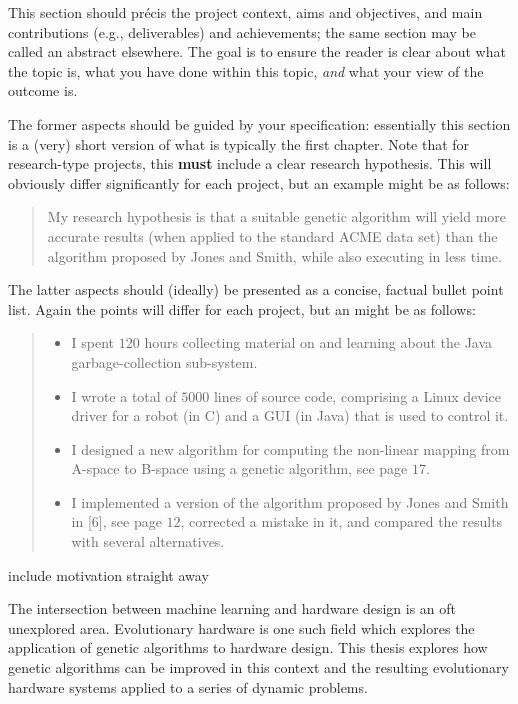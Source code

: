 \noindent
{
	\color{red}
This section should pr\'{e}cis the project context, aims and objectives,
and main contributions (e.g., deliverables) and achievements; the same 
section may be called an abstract elsewhere.  The goal is to ensure the 
reader is clear about what the topic is, what you have done within this 
topic, {\em and} what your view of the outcome is.

The former aspects should be guided by your specification: essentially 
this section is a (very) short version of what is typically the first 
chapter.  Note that for research-type projects, this {\bf must} include 
a clear research hypothesis.  This will obviously differ significantly
for each project, but an example might be as follows:

\begin{quote}
My research hypothesis is that a suitable genetic algorithm will yield
more accurate results (when applied to the standard ACME data set) than 
the algorithm proposed by Jones and Smith, while also executing in less
time.
\end{quote}

\noindent
The latter aspects should (ideally) be presented as a concise, factual 
bullet point list.  Again the points will differ for each project, but 
an might be as follows:

\begin{quote}
\noindent
\begin{itemize}
\item I spent $120$ hours collecting material on and learning about the 
      Java garbage-collection sub-system. 
\item I wrote a total of $5000$ lines of source code, comprising a Linux 
      device driver for a robot (in C) and a GUI (in Java) that is 
      used to control it.
\item I designed a new algorithm for computing the non-linear mapping 
      from A-space to B-space using a genetic algorithm, see page $17$.
\item I implemented a version of the algorithm proposed by Jones and 
      Smith in [6], see page $12$, corrected a mistake in it, and 
      compared the results with several alternatives.
\end{itemize}
\end{quote}
}

\todo include motivation straight away

The intersection between machine learning and hardware design is an oft
unexplored area. Evolutionary hardware is one such field which explores
the application of genetic algorithms to hardware design. This thesis
explores how genetic algorithms can be improved in this context and
the resulting evolutionary hardware systems applied to a series of
dynamic problems.

